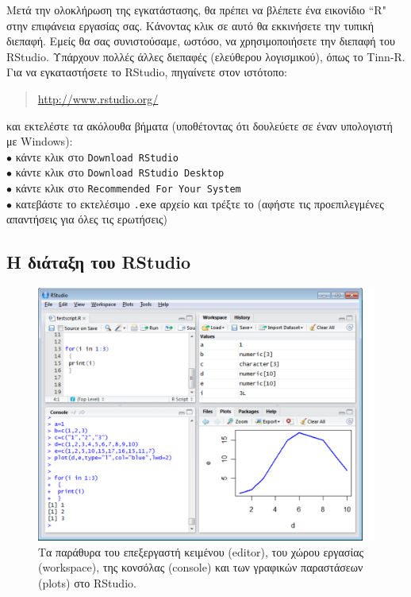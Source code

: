 \documentclass[a4paper,10pt,twocolumn]{article}
\makeatletter
\let\SF@@footnote\footnote
\def\footnote{\ifx\protect\@typeset@protect
 \expandafter\SF@@footnote
 \else
 \expandafter\SF@gobble@opt
 \fi
}
\edef\SF@gobble@opt{\noexpand\protect
 \expandafter\noexpand\csname SF@gobble@opt \endcsname}
\makeatother
\begin{document}
Μετά την ολοκλήρωση της εγκατάστασης, θα πρέπει να βλέπετε ένα εικονίδιο ``R" στην επιφάνεια
εργασίας σας. Κάνοντας κλικ σε αυτό θα εκκινήσετε την τυπική διεπαφή. Εμείς θα σας συνιστούσαμε,
ωστόσο, να χρησιμοποιήσετε την διεπαφή του RStudio. \footnote{Υπάρχουν πολλές άλλες διεπαφές
(ελεύθερου λογισμικού), όπως το Tinn-R.} Για να εγκαταστήσετε το RStudio, πηγαίνετε στον ιστότοπο: 
\begin{quote}
  \url{http://www.rstudio.org/}
\end{quote}
και εκτελέστε τα ακόλουθα βήματα (υποθέτοντας ότι δουλεύετε σε έναν υπολογιστή με Windows):\\
\noindent $\bullet$ κάντε κλικ στο \texttt{Download RStudio}\\
\noindent $\bullet$ κάντε κλικ στο \texttt{Download RStudio Desktop}\\
\noindent $\bullet$ κάντε κλικ στο \texttt{Recommended For Your System}\\
\noindent $\bullet$ κατεβάστε το εκτελέσιμο \texttt{.exe} αρχείο και τρέξτε το 
(αφήστε τις προεπιλεγμένες απαντήσεις για όλες τις ερωτήσεις)

\subsection{Η διάταξη του RStudio}

\begin{figure}[htb]
  \centering
  \includegraphics[width=13cm, clip=true, trim=0cm 0cm 9mm 0cm]{img/rstudio_screenshot.pdf}
  \caption{Τα παράθυρα του επεξεργαστή κειμένου (editor), του χώρου εργασίας (workspace), 
  της κονσόλας (console) και των γραφικών παραστάσεων (plots) στο RStudio.}
  \label{fig:screenshot}
\end{figure}
\end{document}
